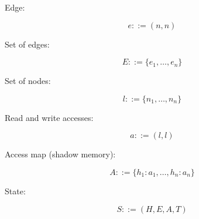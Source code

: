 \documentclass{article}
\newcommand{\HeapMap}{H}
\newcommand{\TaskMap}{T}
\newcommand{\HName}{h}
\newcommand{\State}{S}
\newcommand{\Node}{n}
\newcommand{\Edges}{E}
\newcommand{\Access}{a}
\newcommand{\Edge}{e}
\newcommand{\Nodes}{l}
\newcommand{\AccessMap}{A}
\newcommand{\Grmeq}{::=}
\begin{document}
Edge:

$$
\Edge \Grmeq (\Node,\Node)
$$

Set of edges:

$$
\Edges \Grmeq \{ \Edge_1,\dots,\Edge_n\}
$$

Set of nodes:

$$
\Nodes \Grmeq \{ \Node_1,\dots,\Node_n\}
$$

Read and write accesses:

$$
\Access \Grmeq (\Nodes,\Nodes)
$$

Access map (shadow memory):

$$
\AccessMap \Grmeq \{ \HName_1\colon \Access_1,\dots,\HName_n\colon\Access_n\}
$$

State:

$$
\State ::= (\HeapMap,\Edges,\AccessMap,\TaskMap)
$$

\newpage
\end{document}
